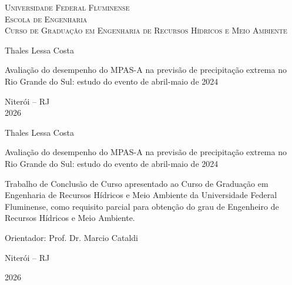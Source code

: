 \documentclass[12pt,a4paper,oneside]{book}
\begin{document}
\begin{titlepage}
\begin{center}
\Large{\textsc{Universidade Federal Fluminense}\\
\textsc{Escola de Engenharia}\\
\textsc{Curso de Graduação em Engenharia de Recursos Hídricos e Meio Ambiente}}
\par\vfill
\LARGE{Thales Lessa Costa}
\par\vfill
\LARGE{Avaliação do desempenho do MPAS-A na previsão de precipitação extrema no Rio Grande do Sul: estudo do evento de abril-maio de 2024}
\par\vfill
\Large{Niterói -- RJ\\
2026}
\end{center}
\end{titlepage}

\begin{center}
Thales Lessa Costa

\vfill

Avaliação do desempenho do MPAS-A na previsão de precipitação extrema no Rio Grande do Sul: estudo do evento de abril-maio de 2024

\vspace{3cm}

\begin{flushright}
\begin{minipage}{0.55\textwidth}
Trabalho de Conclusão de Curso apresentado ao Curso de Graduação em Engenharia de Recursos Hídricos e Meio Ambiente da Universidade Federal Fluminense, como requisito parcial para obtenção do grau de Engenheiro de Recursos Hídricos e Meio Ambiente.
\end{minipage}
\end{flushright}

\vspace{3cm}

Orientador: Prof. Dr. Marcio Cataldi


\vfill

Niterói -- RJ

2026
\end{center}
\pagebreak

\setcounter{page}{2}

\vspace*{\fill}
\begin{center}
\end{center}
\vspace*{\fill}
\clearpage
\end{document}
